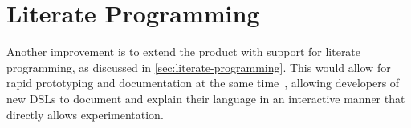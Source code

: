\section{Literate Programming}
\label{sec:literate-programming-discuss}

Another improvement is to extend the product with support for literate
programming, as discussed in \cref{sec:literate-programming}. This would allow 
for rapid prototyping and documentation at the same time~\cite{schulte2012},
allowing developers of new DSLs to document and explain their language in an
interactive manner that directly allows experimentation.


